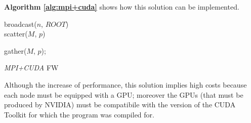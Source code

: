 \textbf{Algorithm \ref*{alg:mpi+cuda}} shows how this solution
can be implemented.
\begin{algorithm}[h!]

\SetAlgoLined
\DontPrintSemicolon
broadcast($n$, $ROOT$) \\
scatter($M$, $p$)

gather($M$, $p$);
\;
\;

 
\caption{\emph{MPI+CUDA} FW}\label{alg:mpi+cuda}
\end{algorithm}

Although the increase of performance, this solution implies
high costs because each node must be equipped with a GPU; moreover the GPUs
(that must be produced by NVIDIA) must be compatibile with the version of the CUDA Toolkit
for which the program was compiled for.
